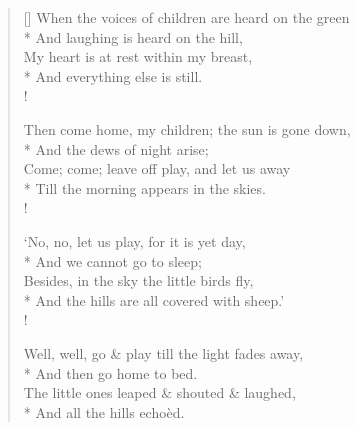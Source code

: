 \documentclass[MAIN]{subfiles}
\begin{document}
\settowidth{\versewidth}{When the voices of children are heard on the green}
\begin{verse}[\versewidth]
When the voices of children are heard on the green\\*
\vin And laughing is heard on the hill,\\
My heart is at rest within my breast,\\*
\vin And everything else is still.\\!

Then come home, my children; the sun is gone down,\\*
\vin And the dews of night arise;\\
Come; come; leave off play, and let us away\\*
\vin Till the morning appears in the skies.\\!

`No, no, let us play, for it is yet day,\\*
\vin And we cannot go to sleep;\\
Besides, in the sky the little birds fly,\\*
\vin And the hills are all covered with sheep.'\\!

Well, well, go \& play till the light fades away,\\*
\vin And then go home to bed.\\
The little ones leaped \& shouted \& laughed,\\*
\vin And all the hills echoèd.
\end{verse}
\end{document}
